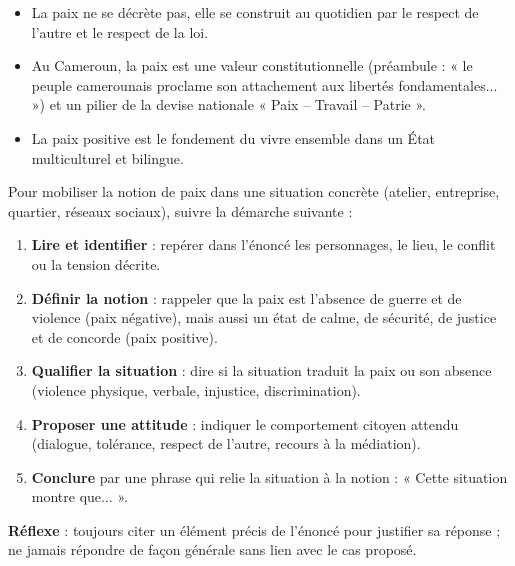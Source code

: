 \documentclass[11pt]{article}
\newcommand{\cle}[1]{{\popxbold\color{popdark}#1}}
\begin{document}
\begin{aretenir}
\begin{itemize}
\item La paix ne se décrète pas, elle se construit au quotidien par le respect de l'autre et le respect de la loi.
\item Au Cameroun, la paix est une valeur constitutionnelle (préambule : « le peuple camerounais proclame son attachement aux libertés fondamentales... ») et un pilier de la devise nationale « Paix – Travail – Patrie ».
\item La paix positive est le fondement du \cle{vivre ensemble} dans un État multiculturel et bilingue.
\end{itemize}
\end{aretenir}

\begin{methode}
Pour mobiliser la notion de \cle{paix} dans une situation concrète (atelier, entreprise, quartier, réseaux sociaux), suivre la démarche suivante :
\begin{enumerate}
\item \textbf{Lire et identifier} : repérer dans l'énoncé les personnages, le lieu, le conflit ou la tension décrite.
\item \textbf{Définir la notion} : rappeler que la paix est l'absence de guerre et de violence (paix négative), mais aussi un état de \cle{calme}, de \cle{sécurité}, de \cle{justice} et de concorde (paix positive).
\item \textbf{Qualifier la situation} : dire si la situation traduit la paix ou son absence (violence physique, verbale, injustice, discrimination).
\item \textbf{Proposer une attitude} : indiquer le comportement citoyen attendu (dialogue, tolérance, respect de l'autre, recours à la médiation).
\item \textbf{Conclure} par une phrase qui relie la situation à la notion : « Cette situation montre que... ».
\end{enumerate}
\textbf{Réflexe} : toujours citer un élément précis de l'énoncé pour justifier sa réponse ; ne jamais répondre de façon générale sans lien avec le cas proposé.
\end{methode}
\end{document}
